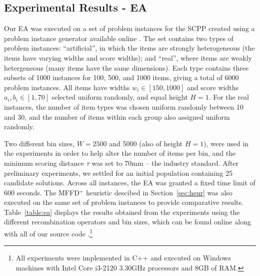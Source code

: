 \documentclass{IEEEtran}
\begin{document}
\subsection{Experimental Results - EA}
\label{sub:expea}
Our EA was executed on a set of problem instances for the SCPP created using a problem instance generator available online \cite{hawa2019inst}. The set contains two types of problem instances: ``artificial'', in which the items are strongly heterogeneous (the items have varying widths and score widths); and ``real'', where items are weakly hetergeneous (many items have the same dimensions). Each type contains three subsets of 1000 instances for 100, 500, and 1000 items, giving a total of 6000 problem instances. All items have widths $w_i \in [150,1000]$ and score widths $a_i, b_i \in [1,70]$ selected uniform randomly, and equal height $H=1$. For the real instances, the number of item types was chosen uniform randomly between 10 and 30, and the number of items within each group also assigned uniform randomly.

Two different bin sizes, $W = 2500$ and 5000 (also of height $H=1$), were used in the experiments in order to help alter the number of items per bin, and the minimum scoring distance $\tau$ was set to 70mm -- the industry standard. After preliminary experiments, we settled for an initial population containing 25 candidate solutions. Across all instances, the EA was granted a fixed time limit of 600 seconds. The MFFD$^+$ heuristic descibed in Section~\ref{sec:heur} was also executed on the same set of problem instances to provide comparative results. Table~\ref{table:ea} displays the results obtained from the experiments using the different recombination operators and bin sizes, which can be found online along with all of our source code \cite{hawa2019ea}.\footnote{All experiments were implemented in C++ and executed on Windows machines with Intel Core i3-2120 3.30GHz processors and 8GB of RAM.}
\end{document}

